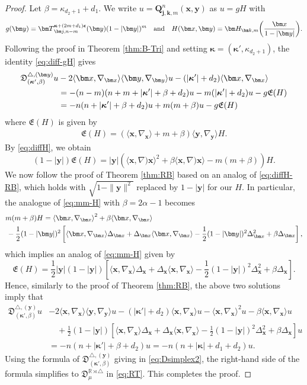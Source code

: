\documentclass{amsart}
\theoremstyle{remark}
\def\la{{\langle}}
\def\ra{{\rangle}}
\def\fD{{\mathfrak D}}
\def\fE{{\mathfrak E}}
\def\a{{\alpha}}
\def\b{{\beta}}
\def\k{{\kappa}}
\def\la{{\langle}}
\def\ra{{\rangle}}
\def\xb{{\bm x}}
\def\yb{{\bm y}}
\def\Tb{{\bm T}}
\def\RR{{\mathbb R}}
\def\bep{{\boldsymbol{\epsilon}}}
\def\bk{{\boldsymbol{\kappa}}}
\begin{document}
\begin{proof}
Let $\b = \k_{d_2  +1} + d_1$. We write $u =  \bm Q_{\bm j, \bm k, m}^n(\bm x,\bm y)$ as $u = g H$ with 
$$
  g(\yb) =  \Tb_{\bm j, n-m}^{\bk+(2m+d_1)\bep}(\bm y) (1-|\bm y|)^m \quad \hbox{and}\quad  
     H(\xb,\yb) = \bm H_{\bm k, m}  \bigg(\frac{\bm x}{1-|\bm y|} \bigg).
$$
Following the proof in Theorem \ref{thm:B-Tri} and setting $\bk = (\bk', \k_{d_2 +1})$, the identity 
\eqref{eq:diff-gH} gives
\begin{align} \label{eq:diff-gH-RT}
\fD_{(\bk',\b)}^{\triangle, (\yb)} u & -  2 \la \bm x, \nabla_{\bm x} \ra  \la \bm y, \nabla_{\bm y} \ra u 
- (|\bk'|+ d_2)\la \bm x, \nabla_{\bm x} \ra \\
& =  - (n-m) (n+ m + |\bk'|+ \b +d_2) u - m (|\bk'|+ d_2)u  - g \fE(H)   \notag \\
& = - n(n + |\bk'| + \b +d_2) u + m (m+ \b) u - g \fE(H)  \notag \notag
\end{align}
where $\fE(H)$ is given by 
\begin{align*}
  \fE(H) =  (\la \bm x, \nabla_{\bm x} \ra +m + \b) \la \bm y, \nabla_{\bm y} \ra H.
\end{align*}
By \eqref{eq:diffH}, we obtain
$$
   (1-|\yb|) \fE(H) = |\yb| \left(\la \xb,\nabla)\xb\ra^2 + \b \la \xb,\nabla)\xb\ra - m(m+\b) \right)H. 
$$
We now follow the proof of Theorem \ref{thm:RB} based on an analog of \eqref{eq:diffH-RB}, which holds
with $\sqrt{1-\|\yb\|^2}$ replaced by $1-|\yb|$ for our $H$. In particular, the analogue of \eqref{eq:mm-H} 
with $\b = 2 \a -1$ becomes 
\begin{align*} %
   & m(m+ \b) H  = \la \xb, \nabla_\xb \ra^2 + \b \la \xb, \nabla_\xb \ra \\
    &\,  - \frac12 (1-|\yb|)^2 \left[  \la \xb, \nabla_\xb \ra \Delta_\xb + \Delta_\xb \la \xb, \nabla_\xb\ra 
      - \frac 12(1-|\yb|)^2 \Delta_\xb^2 + \b \Delta_\xb \right], \notag
\end{align*} 
which implies an analog of \eqref{eq:mm-H} given by 
$$
\fE(H) = \frac12 |\yb|(1-|\yb|) \left[  \la \xb, \nabla_\xb\ra \Delta_\xb + \Delta_\xb  \la \xb, \nabla_\xb\ra
   - \frac 12(1-|\yb|)^2 \Delta_\xb ^2 + \b \Delta_\xb  \right].
$$
Hence, similarly to the proof of Theorem \ref{thm:RB}, the above two solutions imply that
\begin{align*}
\fD_{(\bk',\b)}^{\triangle, (\yb)} u & -  2 \la \bm x, \nabla_{\bm x} \ra  \la \bm y, \nabla_{\bm y} \ra u 
- (|\bk'|+ d_2)\la \bm x, \nabla_{\bm x} \ra u - \la \xb, \nabla_\xb \ra^2 u - \b \la \xb, \nabla_\xb \ra  u\\
& \quad+ \frac12 (1-|\yb|) \left[  \la \xb, \nabla_\xb\ra \Delta_\xb + \Delta_\xb  \la \xb, \nabla_\xb\ra
   - \frac 12(1-|\yb|)^2 \Delta_\xb ^2 + \b \Delta_\xb  \right] u\\
   & = - n(n + |\bk'| + \b +d_2) u = -n (n+|\bk| + d_1+d_2) u.
\end{align*}
Using the formula of $\fD_{(\bk',\b)}^{\triangle, (\yb)}$ giving in \eqref{eq:Dsimplex2}, the
right-hand side of the formula simplifies to $\fD_\mu^{\RR \rtimes \triangle}$ in \eqref{eq:RT}. This
completes the proof.  
\end{proof}
\end{document}
